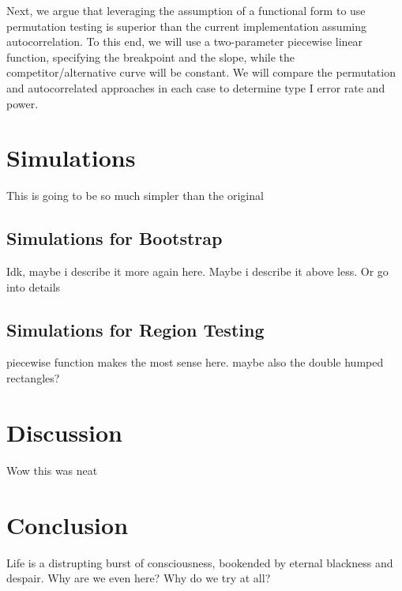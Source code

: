 \documentclass{article}
\begin{document}
Next, we argue that leveraging the assumption of a functional form to use permutation testing is superior than the current implementation assuming autocorrelation. To this end, we will use a two-parameter piecewise linear function, specifying the breakpoint and the slope, while the competitor/alternative curve will be constant. We will compare the permutation and autocorrelated approaches in each case to determine type I error rate and power. 

\section{Simulations}

This is going to be so much simpler than the original

\subsection{Simulations for Bootstrap}

Idk, maybe i describe it more again here. Maybe i describe it above less. Or go into details


\subsection{Simulations for Region Testing}

piecewise function makes the most sense here. maybe also the double humped rectangles?

\section{Discussion}

Wow this was neat

\section{Conclusion}

Life is a distrupting burst of consciousness, bookended by eternal blackness and despair. Why are we even here? Why do we try at all?
\end{document}
